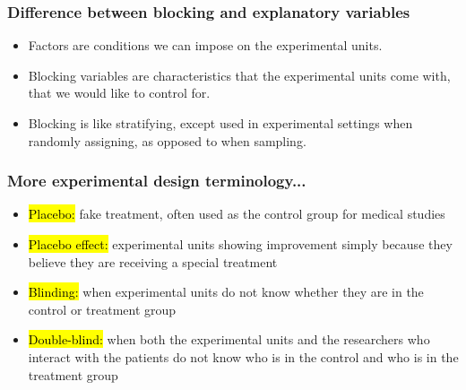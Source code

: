 \documentclass[slidestop,compress,mathserif]{beamer}
\begin{document}


\begin{frame}
	\frametitle{Difference between blocking and explanatory variables}

	\begin{itemize}
		\item Factors are conditions we can impose on the experimental units.
		\item Blocking variables are characteristics that the experimental units come with, that we would like to control for.
		\item Blocking is like stratifying, except used in experimental settings when randomly assigning, as opposed to when sampling.
	\end{itemize}

\end{frame}


\begin{frame}
	\frametitle{More experimental design terminology...}

	\begin{itemize}
		\item \hl{Placebo:} fake treatment, often used as the control group for medical studies
		\item \hl{Placebo effect:} experimental units showing improvement simply because they believe they are receiving a special treatment
		\item \hl{Blinding:} when experimental units do not know whether they are in the control or treatment group
		\item \hl{Double-blind:} when both the experimental units and the researchers who interact with the patients do not know who is in the control and who is in the treatment group

	\end{itemize}

\end{frame}




\end{document}
